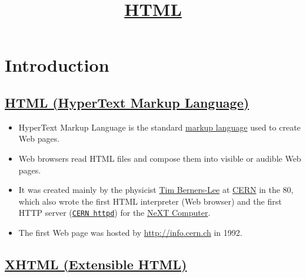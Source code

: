 \title{\href{http://www.w3.org/html/}{HTML}}

\maketitle
\tableofcontents

\lstset{inputencoding=utf8/latin1,language=HTML,basicstyle=\footnotesize\ttfamily}

\newcommand{\htmloutput}[1]{%
%
\ifx \HCode\Undfef%
\else%
\HCode{%
  <iframe src="#1.html">%
  </iframe>%
}%
\fi%
}


\chapter{Introduction}

\section{\href{http://en.wikipedia.org/wiki/HTML}{HTML (HyperText Markup Language)}}

\begin{itemize}
\item HyperText Markup Language is the standard
  \href{http://en.wikipedia.org/wiki/Markup_language}{markup language}
  used to create Web pages.
\item Web browsers read HTML files and compose them into visible
  or audible Web pages.
\item It was created mainly by the physicist
  \href{http://en.wikipedia.org/wiki/Tim_Berners-Lee}{Tim Berners-Lee}
  at \href{http://en.wikipedia.org/wiki/CERN}{CERN} in the 80, which
  also wrote the first HTML interpreter (Web browser) and the first
  HTTP server (\href{http://en.wikipedia.org/wiki/CERN_httpd}{\tt CERN
    httpd}) for the
  \href{http://en.wikipedia.org/wiki/NeXT_Computer}{NeXT Computer}.
\item The first Web page was hosted by \url{http://info.cern.ch} in
  1992.
\end{itemize}


\section{\href{http://en.wikipedia.org/wiki/XHTML}{XHTML (Extensible HTML)}}

